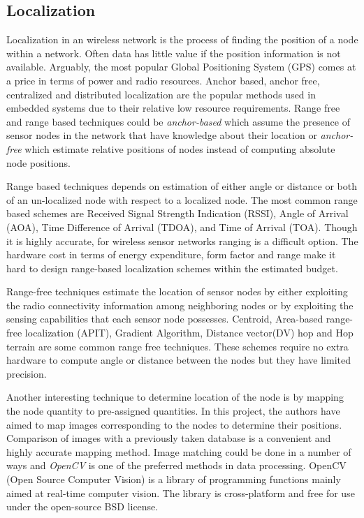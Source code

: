 \documentclass{sig-alternate-05-2015}
\begin{document}
\subsection{Localization}
Localization in an wireless network is the process of finding the position of a node within a network. Often data has little value if the position information is not available. Arguably, the most popular Global Positioning System (GPS) comes at a price in terms of power and radio resources. Anchor based, anchor free, centralized and distributed localization are the popular methods used in embedded systems due to their relative low resource requirements. Range free and range based techniques could be \textit{anchor-based} which assume the presence of sensor nodes in the network that have knowledge about their location or \textit{anchor-free} which estimate relative positions of nodes instead of computing absolute node positions.

Range based techniques depends on estimation of either angle or distance or both of an un-localized node with respect to a localized node. The most common range based schemes are Received Signal Strength Indication (RSSI), Angle of Arrival (AOA), Time Difference of Arrival (TDOA), and Time of Arrival (TOA). Though it is highly accurate, for wireless sensor networks ranging is a difficult option. The hardware cost in terms of energy expenditure, form factor and range make it hard to design range-based localization schemes within the estimated budget.

Range-free techniques estimate the location of sensor nodes by either exploiting the radio connectivity information among neighboring nodes or by exploiting the sensing capabilities that each sensor node possesses. Centroid, Area-based range-free localization (APIT), Gradient Algorithm, Distance vector(DV) hop and Hop terrain are some common range free techniques. These schemes require no extra hardware to compute angle or distance between the nodes but they have limited precision.

Another interesting technique to determine location of the node is by mapping the node quantity to pre-assigned quantities. In this project, the authors have aimed to map images corresponding to the nodes to determine their positions. Comparison of images with a previously taken database is a convenient and  highly accurate mapping method. Image matching could be done in a number of ways and \textit{OpenCV}\cite{opencv:opencv} is one of the preferred methods in data processing. OpenCV (Open Source Computer Vision) is a library of programming functions mainly aimed at real-time computer vision. The library is cross-platform and free for use under the open-source BSD license. 
\end{document}
